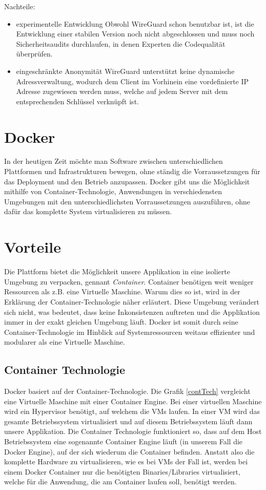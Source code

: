 Nachteile:
\begin{itemize}
    \item experimentelle Entwicklung \newline
    Obwohl WireGuard schon benutzbar ist, ist die Entwicklung einer stabilen Version noch nicht abgeschlossen und muss noch Sicherheitsaudits durchlaufen, in denen Experten die Codequalität überprüfen.
    \item eingeschränkte Anonymität \newline
    WireGuard unterstützt keine dynamische Adressverwaltung, wodurch dem Client im Vorhinein eine vordefinierte IP Adresse zugewiesen werden muss, welche auf jedem Server mit dem entsprechenden Schlüssel verknüpft ist.
\end{itemize}
\newpage
\section{Docker}
In der heutigen Zeit möchte man Software zwischen unterschiedlichen Plattformen und
Infrastrukturen bewegen, ohne ständig die Vorraussetzungen für das Deployment und den Betrieb
anzupassen.\newline
Docker gibt uns die Möglichkeit mithilfe von Container-Technologie, Anwendungen in
verschiedensten Umgebungen mit den unterschiedlichsten Vorraussetzungen auszuführen, ohne
dafür das komplette System virtualisieren zu müssen.
\section{Vorteile}
Die Plattform bietet die Möglichkeit unsere Applikation in eine isolierte Umgebung zu verpacken,
gennant \textit{Container}. Container benötigen weit weniger Ressourcen als z.B. eine Virtuelle
Maschine. Warum dies so ist, wird in der Erklärung der Container-Technologie näher erläutert.
Diese Umgebung verändert sich nicht, was bedeutet, dass keine Inkonsistenzen auftreten und die
Applikation immer in der exakt gleichen Umgebung läuft.
Docker ist somit durch seine Container-Technologie im Hinblick auf Systemressourcen weitaus
effizienter und modularer als eine Virtuelle Maschine.
\subsection{Container Technologie}
Docker basiert auf der Container-Technologie. Die Grafik \ref{contTech} vergleicht eine Virtuelle Maschine mit
einer Container Engine. Bei einer virtuellen Maschine wird ein Hypervisor benötigt, auf welchem die VMs laufen. In einer VM wird das gesamte Betriebssystem virtualisiert und auf diesem Betriebssystem läuft dann
unsere Applikation. Die Container Technologie funktioniert so, dass auf dem Host Betriebssystem eine sogenannte
Container Engine läuft (in unserem Fall die Docker Engine), auf der sich wiederum die Container
befinden. Anstatt also die komplette Hardware zu virtualisieren, wie es bei VMs der Fall ist, werden bei
einem Docker Container nur die benötigten Binaries/Libraries virtualisiert, welche für die
Anwendung, die am Container laufen soll, benötigt werden.

